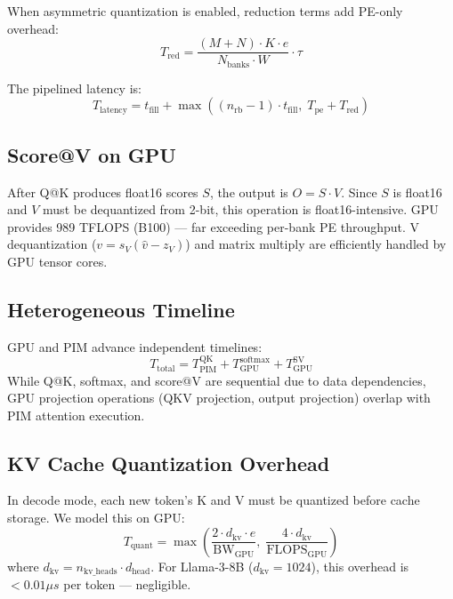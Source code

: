 When asymmetric quantization is enabled, reduction terms add PE-only overhead:
\begin{equation}
T_{\text{red}} = \frac{(M+N) \cdot K \cdot e}{N_{\text{banks}} \cdot W} \cdot \tau
\end{equation}

The pipelined latency is:
\begin{equation}
T_{\text{latency}} = t_{\text{fill}} + \max\!\left((n_{\text{rb}}-1) \cdot t_{\text{fill}},\; T_{\text{pe}} + T_{\text{red}}\right)
\label{eq:pipeline}
\end{equation}

\subsection{Score@V on GPU}

After Q@K produces float16 scores $S$, the output is $O = S \cdot V$.
Since $S$ is float16 and $V$ must be dequantized from 2-bit, this operation is float16-intensive.
GPU provides 989 TFLOPS (B100) --- far exceeding per-bank PE throughput.
V dequantization ($v = s_V(\hat{v} - z_V)$) and matrix multiply are efficiently handled by GPU tensor cores.

\subsection{Heterogeneous Timeline}

GPU and PIM advance independent timelines:
\begin{equation}
T_{\text{total}} = T_{\text{PIM}}^{\text{QK}} + T_{\text{GPU}}^{\text{softmax}} + T_{\text{GPU}}^{\text{SV}}
\end{equation}
While Q@K, softmax, and score@V are sequential due to data dependencies, GPU projection operations (QKV projection, output projection) overlap with PIM attention execution.

\subsection{KV Cache Quantization Overhead}

In decode mode, each new token's K and V must be quantized before cache storage.
We model this on GPU:
\begin{equation}
T_{\text{quant}} = \max\!\left(\frac{2 \cdot d_{\text{kv}} \cdot e}{\text{BW}_{\text{GPU}}},\; \frac{4 \cdot d_{\text{kv}}}{\text{FLOPS}_{\text{GPU}}}\right)
\end{equation}
where $d_{\text{kv}} = n_{\text{kv\_heads}} \cdot d_{\text{head}}$.
For Llama-3-8B ($d_{\text{kv}}\!=\!1024$), this overhead is $<\!0.01\mu s$ per token --- negligible.
